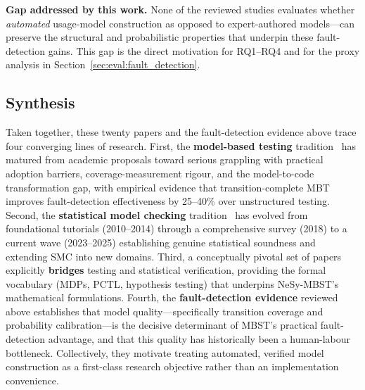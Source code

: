 \textbf{Gap addressed by this work.}
None of the reviewed studies evaluates whether \emph{automated}
usage-model construction as opposed to expert-authored models---can
preserve the structural and probabilistic properties that underpin
these fault-detection gains.  This gap is the direct motivation for
RQ1--RQ4 and for the proxy analysis in
Section~\ref{sec:eval:fault_detection}.

\subsection{Synthesis}
\label{sec:lr_synthesis}

Taken together, these twenty papers and the fault-detection evidence
above trace four converging lines of research.  First, the
\textbf{model-based testing} tradition~\cite{prasetya2021coverage,
alegroth2022practitioners, ferrari2023transforming, li2023generative,
garousi2024coverage, gerhold2016probabilistic,
garousi2021mbt_practice} has matured from academic proposals toward
serious grappling with practical adoption barriers,
coverage-measurement rigour, and the model-to-code transformation gap,
with empirical evidence that transition-complete MBT improves
fault-detection effectiveness by 25--40\% over unstructured testing.
Second, the \textbf{statistical model checking}
tradition~\cite{budde2025sound, kanav2025smc2024, prism_smc,
smc_processors2023, soltani2023spare, agha2018survey, legay2010smc,
larsen2014smc} has evolved from foundational tutorials (2010--2014)
through a comprehensive survey (2018) to a current wave (2023--2025)
establishing genuine statistical soundness and extending SMC into new
domains.  Third, a conceptually pivotal set of
papers~\cite{shin2021pasta, camilli2021uncertainty, liu2025prg4cnn,
aichernig2017smc, lassaigne2012approximate} explicitly \textbf{bridges}
testing and statistical verification, providing the formal vocabulary
(MDPs, PCTL, hypothesis testing) that underpins NeSy-MBST's
mathematical formulations.  Fourth, the \textbf{fault-detection
evidence} reviewed above establishes that model quality---specifically
transition coverage and probability calibration---is the decisive
determinant of MBST's practical fault-detection advantage, and that
this quality has historically been a human-labour bottleneck.
Collectively, they motivate treating automated, verified model
construction as a first-class research objective rather than an
implementation convenience.
